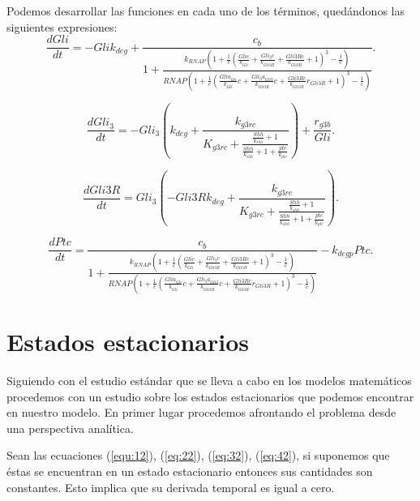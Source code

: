 Podemos desarrollar las funciones en cada uno de los términos, quedándonos las siguientes expresiones:
\begin{equation}
\frac{dGli}{dt}=- Gli k_{deg} + \frac{c_{b}}{1 + \frac{k_{RNAP} \left(1 + \frac{1}{c} \left(\frac{Gli c}{k_{Gli}} + \frac{Gli_{3} c}{k_{Gli3R}} + \frac{Gli3R c}{k_{Gli3R}} + 1\right)^{3} - \frac{1}{c}\right)}{RNAP \left(1 + \frac{1}{c} \left(\frac{Gli a_{Gli}}{k_{Gli}} c + \frac{Gli_{3} a_{Gli3}}{k_{Gli3R}} c + \frac{Gli3R c}{k_{Gli3R}} r_{Gli3R} + 1\right)^{3} - \frac{1}{c}\right)}}.
\end{equation}


\begin{equation}
\frac{dGli_3}{dt}=- Gli_{3} \left(k_{deg} + \frac{k_{g3rc}}{K_{g3rc} + \frac{\frac{Shh}{k_{shh}} + 1}{\frac{Shh}{k_{shh}} + 1 + \frac{ptc}{k_{ptc}}}}\right) + \frac{r_{g3b}}{Gli}.
\end{equation}

\begin{equation}
\frac{dGli3R}{dt}=Gli_{3} \left(- Gli3R k_{deg} + \frac{k_{g3rc}}{K_{g3rc} + \frac{\frac{Shh}{k_{shh}} + 1}{\frac{Shh}{k_{shh}} + 1 + \frac{ptc}{k_{ptc}}}}\right).
\end{equation}

\begin{equation}
\frac{dPtc}{dt}=\frac{c_{b}}{1 + \frac{k_{RNAP} \left(1 + \frac{1}{c} \left(\frac{Gli c}{k_{Gli}} + \frac{Gli_{3} c}{k_{Gli3R}} + \frac{Gli3R c}{k_{Gli3R}} + 1\right)^{3} - \frac{1}{c}\right)}{RNAP \left(1 + \frac{1}{c} \left(\frac{Gli a_{Gli}}{k_{Gli}} c + \frac{Gli_{3} a_{Gli3}}{k_{Gli3R}} c + \frac{Gli3R c}{k_{Gli3R}} r_{Gli3R} + 1\right)^{3} - \frac{1}{c}\right)}} - k_{deg p} Ptc.
\end{equation}




\section{Estados estacionarios}\label{apartado3.4}
Siguiendo con el estudio estándar que se lleva a cabo en los modelos matemáticos procedemos con un estudio sobre los estados estacionarios que podemos encontrar en nuestro modelo. En primer lugar procedemos afrontando el problema desde una perspectiva analítica. 

Sean las ecuaciones (\ref{equ:12}), (\ref{eq:22}), (\ref{eq:32}), (\ref{eq:42}), si suponemos que éstas se encuentran en un estado estacionario entonces sus cantidades son constantes. Esto implica que su derivada temporal es igual a cero.

